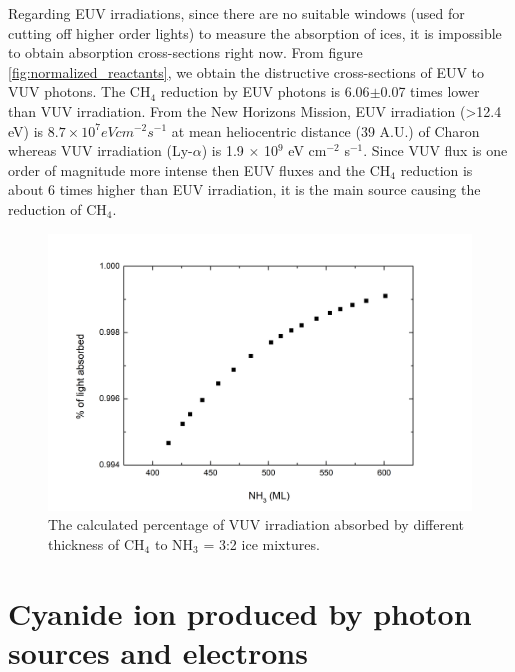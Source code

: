 Regarding EUV irradiations, since there are no suitable windows (used for cutting off higher order lights) to measure the absorption of ices, it is impossible to obtain absorption cross-sections right now. From figure \ref{fig:normalized_reactants}, we obtain the distructive cross-sections of EUV to VUV photons. The CH$_4$ reduction by EUV photons is 6.06$\pm$0.07 times lower than VUV irradiation.  From the New Horizons Mission, EUV irradiation (>12.4 eV) is $8.7 \times 10^7 eV cm^{-2} s^{-1}$ at mean heliocentric distance (39 A.U.) of Charon whereas VUV irradiation (Ly-$\alpha$) is 1.9 $\times$ 10$^9$ eV cm$^{-2}$ s$^{-1}$\cite{grundy2016formation}. Since VUV flux is one order of magnitude more intense then EUV fluxes and the CH$_4$ reduction is about 6 times higher than EUV irradiation, it is the main source causing the reduction of CH$_4$.

\begin{figure}
\centering
\includegraphics[width=\textwidth]{figures/chapter4/absorption_percentage.png}
\caption{The calculated percentage of VUV irradiation absorbed by different thickness of CH$_4$ to NH$_3$ = 3:2 ice mixtures.}
\label{fig:absorption_percentage}
\end{figure}

\section{Cyanide ion produced by photon sources and electrons} %

